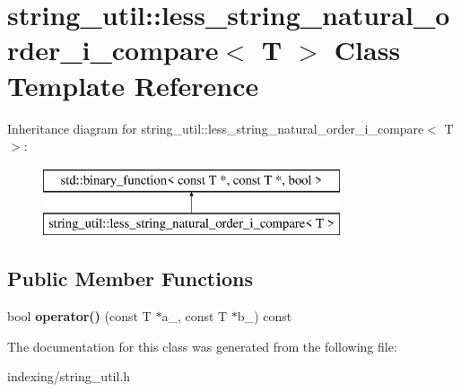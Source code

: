 \hypertarget{classstring__util_1_1less__string__natural__order__i__compare}{\section{string\-\_\-util\-:\-:less\-\_\-string\-\_\-natural\-\_\-order\-\_\-i\-\_\-compare$<$ T $>$ Class Template Reference}
\label{classstring__util_1_1less__string__natural__order__i__compare}
}
Inheritance diagram for string\-\_\-util\-:\-:less\-\_\-string\-\_\-natural\-\_\-order\-\_\-i\-\_\-compare$<$ T $>$\-:\begin{figure}[H]
\begin{center}
\leavevmode
\includegraphics[height=2.000000cm]{classstring__util_1_1less__string__natural__order__i__compare}
\end{center}
\end{figure}
\subsection*{Public Member Functions}
\begin{DoxyCompactItemize}
\item 
\hypertarget{classstring__util_1_1less__string__natural__order__i__compare_a213ba84bcb81fa025951194acbdb899c}{bool {\bfseries operator()} (const T $\ast$a\-\_\-, const T $\ast$b\-\_\-) const }\label{classstring__util_1_1less__string__natural__order__i__compare_a213ba84bcb81fa025951194acbdb899c}

\end{DoxyCompactItemize}


The documentation for this class was generated from the following file\-:\begin{DoxyCompactItemize}
\item 
indexing/string\-\_\-util.\-h\end{DoxyCompactItemize}
